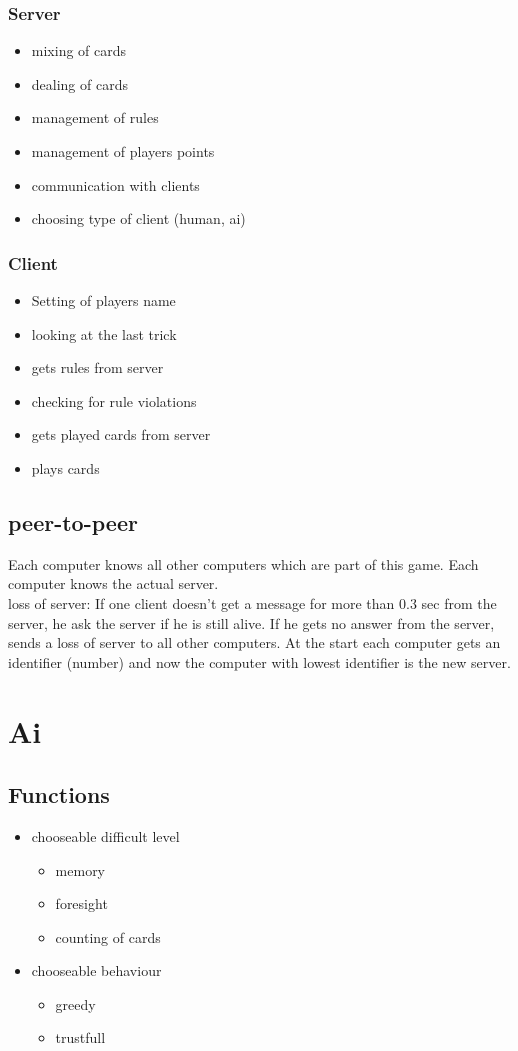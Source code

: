 \documentclass[12pt,a4paper]{article}
\begin{document}
\subsubsection{Server}
\begin{itemize}
\item mixing of cards
\item dealing of cards
\item management of rules
\item management of players points
\item communication with clients
\item choosing type of client (human, ai)
\end{itemize}
\subsubsection{Client}
\begin{itemize}
\item Setting of players name
\item looking at the last trick
\item gets rules from server
\item checking for rule violations
\item gets played cards from server
\item plays cards
\end{itemize}
\subsection{peer-to-peer}
Each computer knows all other computers which are part of this game.
Each computer knows the actual server.\\
loss of server:
If one client doesn't get a message for more than 0.3 sec from the server, he ask the server if he is still alive.
If he gets no answer from the server, sends a loss of server to all other computers.
At the start each computer gets an identifier (number) and now the computer with lowest identifier is the new server.
\newpage
\section{Ai}
\subsection{Functions}
\begin{itemize}
\item chooseable difficult level
\begin{itemize}
\item memory
\item foresight
\item counting of cards
\end{itemize}
\item chooseable behaviour
\begin{itemize}
\item greedy
\item trustfull
\end{itemize}
\end{itemize}
\end{document}
